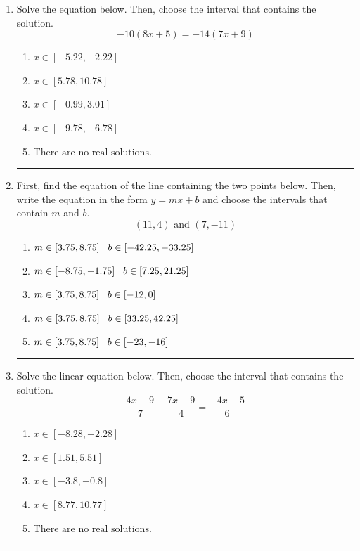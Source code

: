 \documentclass[14pt]{extbook}
\newcommand{\litem}[1]{\item#1\hspace*{-1cm}\rule{\textwidth}{0.4pt}}
\begin{document}
\begin{enumerate}
{\begin{enumerate}[label=\Alph*.]
\end{enumerate} }
\litem{
Solve the equation below. Then, choose the interval that contains the solution.\[ -10(8x + 5) = -14(7x + 9) \]\begin{enumerate}[label=\Alph*.]
\item \( x \in [-5.22, -2.22] \)
\item \( x \in [5.78, 10.78] \)
\item \( x \in [-0.99, 3.01] \)
\item \( x \in [-9.78, -6.78] \)
\item \( \text{There are no real solutions.} \)

\end{enumerate} }
\litem{
First, find the equation of the line containing the two points below. Then, write the equation in the form $ y=mx+b $ and choose the intervals that contain $m$ and $b$.\[ (11, 4) \text{ and } (7, -11) \]\begin{enumerate}[label=\Alph*.]
\item \( m \in [3.75, 8.75] \hspace*{3mm} b \in [-42.25, -33.25] \)
\item \( m \in [-8.75, -1.75] \hspace*{3mm} b \in [7.25, 21.25] \)
\item \( m \in [3.75, 8.75] \hspace*{3mm} b \in [-12, 0] \)
\item \( m \in [3.75, 8.75] \hspace*{3mm} b \in [33.25, 42.25] \)
\item \( m \in [3.75, 8.75] \hspace*{3mm} b \in [-23, -16] \)

\end{enumerate} }
\litem{
Solve the linear equation below. Then, choose the interval that contains the solution.\[ \frac{4x -9}{7} - \frac{7x -9}{4} = \frac{-4x -5}{6} \]\begin{enumerate}[label=\Alph*.]
\item \( x \in [-8.28, -2.28] \)
\item \( x \in [1.51, 5.51] \)
\item \( x \in [-3.8, -0.8] \)
\item \( x \in [8.77, 10.77] \)
\item \( \text{There are no real solutions.} \)

\end{enumerate} }
\end{enumerate}
\end{document}

